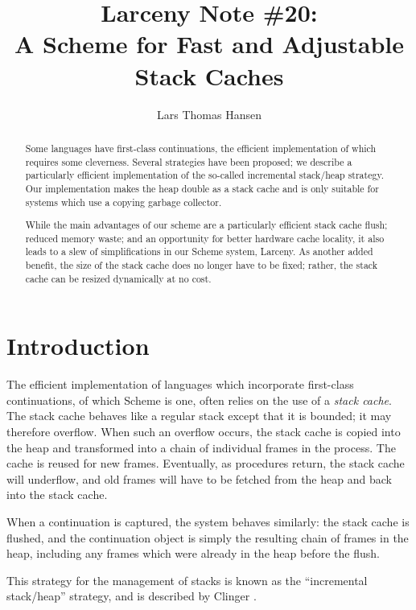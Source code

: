 
\textheight 9in

\title{Larceny Note \#20: \\
       A Scheme for Fast and Adjustable Stack Caches}
\author{Lars Thomas Hansen}


\maketitle

\begin{abstract}
Some languages have first-class continuations, the efficient implementation
of which requires some cleverness.  Several strategies have been proposed; we
describe a particularly efficient implementation of the so-called
incremental stack/heap strategy.  Our implementation makes the heap double
as a stack cache and is only suitable for systems which use a copying
garbage collector.

While the main advantages of our scheme are a particularly efficient stack
cache flush; reduced memory waste; and an opportunity for better hardware
cache locality, it also leads to a slew of simplifications in our Scheme
system, Larceny. As another added benefit, the size of the stack cache does no
longer have to be fixed; rather, the stack cache can be resized dynamically
at no cost.
\end{abstract}

\section{Introduction}

The efficient implementation of languages which incorporate first-class
continuations, of which Scheme \cite{IEEEscheme} is one, often relies on the
use of a {\em stack cache}. The stack cache behaves like a regular stack
except that it is bounded; it may therefore overflow. When such an overflow
occurs, the stack cache is copied into the heap and transformed into a chain
of individual frames in the process. The cache is reused for new frames.
Eventually, as procedures return, the stack cache will underflow, and old
frames will have to be fetched from the heap and back into the stack cache.

When a continuation is captured, the system behaves similarly: the stack
cache is flushed, and the continuation object is simply the resulting chain
of frames in the heap, including any frames which were already in the heap
before the flush.  

This strategy for the management of stacks is known as the ``incremental
stack/heap'' strategy, and is described by Clinger \cite{Clinger:isfc}.

